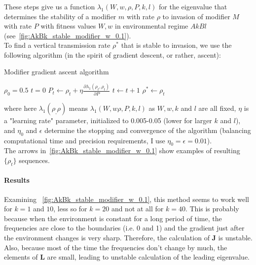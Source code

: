 \documentclass[11pt, oneside]{article}   	%
\let\vec\mathbf
\begin{document}
These steps give us a function $\lambda_1(W, w, \rho, P, k, l)$ for the eigenvalue that determines the stability of a modifier $m$ with rate $\rho$ to invasion of modifier $M$ with rate $P$ with fitness values $W, w$ in environmental regime $AkBl$ (see~\autoref{fig:AkBk_stable_modifier_w_0.1}).
\\

To find a vertical transmission rate $\rho^*$ that is stable to invasion,
we use the following algorithm (in the spirit of gradient descent, or rather, ascent):
\begin{algorithm} 
\caption{Modifier gradient ascent algorithm}\label{algorithm}
\begin{algorithmic}[1]
\State $\rho_{0} = 0.5$
\State $t = 0$
	\State $P_{t} \gets \rho_{t} + \eta \frac{\partial \lambda_1(\rho_{t}, \rho_{t})}{\partial P}$
	\Else
	\EndIf
	\State $t \gets t+1$
\EndWhile
\State $\rho^* \gets \rho_t$
\end{algorithmic}
\end{algorithm}

where here $\lambda_1(\rho_, \rho)$ means $\lambda_1(W, w \rho, P, k, l)$ as $W, w, k$ and $l$ are all fixed, $\eta$ is a "learning rate" parameter, initialized to 0.005-0.05 (lower for larger $k$ and $l$), and $\eta_0$ and $\epsilon$ determine the stopping and convergence of the algorithm (balancing computational time and precision requirements, I use $\eta_0= \epsilon = 0.01$).
\\
The arrows in~\autoref{fig:AkBk_stable_modifier_w_0.1} show examples of resulting $\{\rho_{t}\}$ sequences.

\paragraph{Results}
Examining ~\autoref{fig:AkBk_stable_modifier_w_0.1}, this method seems to work well for $k=1$ and $10$, less so for $k=20$ and not at all for $k=40$.
This is probably because when the environment is constant for a long period of time, the frequencies are close to the boundaries (i.e. 0 and 1) and the gradient just after the environment changes is very sharp.
Therefore, the calculation of $\vec{J}$ is unstable.
Also, because most of the time the frequencies don't change by much, the elements of $\vec{L}$ are small, leading to unstable calculation of the leading eigenvalue.
\\
\end{document}

